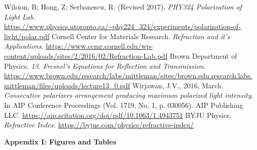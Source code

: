 \documentclass[11pt]{article}
\begin{document}
    \begin{thebibliography}{} \selectfont
         Wilsion, B; Hong, Z; Serbanescu, R. (Revised 2017). \textit{PHY324 Polarization of Light Lab}. \color{blue}\url{https://www.physics.utoronto.ca/~phy224_324/experiments/polarization-of-light/polar.pdf}\color{black}
         Cornell Center for Materials Research. \textit{Refraction and it's Applications}. \color{blue}\url{https://www.ccmr.cornell.edu/wp-content/uploads/sites/2/2016/02/Refraction-Lab.pdf}\color{black}
         Brown Department of Physics. \textit{13. Fresnel's Equations for Reflection and Transmission}. \color{blue}\url{https://www.brown.edu/research/labs/mittleman/sites/brown.edu.research.labs.mittleman/files/uploads/lecture13_0.pdf}\color{black}
         Wirjawan, J.V., 2016, March. \textit{Consecutive polarizers arrangement producing maximum polarized light intensity}. In AIP Conference Proceedings (Vol. 1719, No. 1, p. 030056). AIP Publishing LLC. \color{blue}\url{https://aip.scitation.org/doi/pdf/10.1063/1.4943751}\color{black}
         BYJU Physics. \textit{Refractive Index}. \color{blue}\url{https://byjus.com/physics/refractive-index/}\color{black}
    \end{thebibliography}




    \pagebreak 



     \selectfont \textbf{Appendix I: Figures and Tables}
    
     \selectfont
\end{document}
